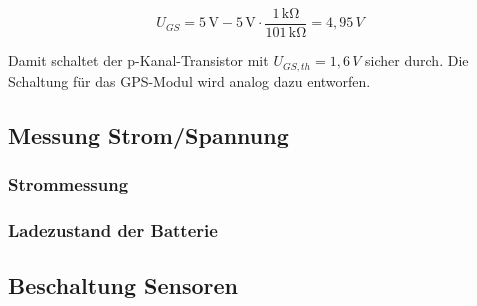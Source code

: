 \begin{minipage}{\textwidth}
\begin{equation}\label{eq:UGS}
{U_{GS}}{=} 5\,\si{\volt}-5\,\si{\volt}\cdot \frac{1\,\si{\kilo\ohm}}{101\,\si{\kilo\ohm}}{=}4,95\,V
\end{equation}
\end{minipage}

Damit schaltet der p-Kanal-Transistor mit $U_{GS,th}=1,6\,V$ sicher durch.
Die Schaltung für das GPS-Modul wird analog dazu entworfen.

\subsection{Messung Strom/Spannung}\label{subsec.MessungStromSpannung}
\subsubsection{Strommessung}
\subsubsection{Ladezustand der Batterie}

\subsection{Beschaltung Sensoren}\label{subsec.BeschaltungSensoren}



